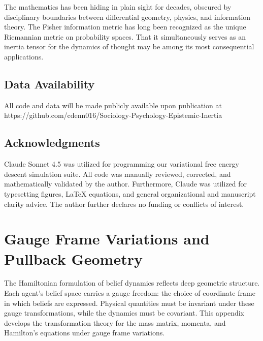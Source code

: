 \documentclass[12pt]{article}
\begin{document}
The mathematics has been hiding in plain sight for decades, obscured by disciplinary boundaries between differential geometry, physics, and information theory. The Fisher information metric has long been recognized as the unique Riemannian metric on probability spaces. That it simultaneously serves as an inertia tensor for the dynamics of thought may be among its most consequential applications.

\subsection*{Data Availability}
All code and data will be made publicly available upon publication at \\ 
https://github.com/cdenn016/Sociology-Psychology-Epistemic-Inertia


\subsection*{Acknowledgments}
Claude Sonnet 4.5 was utilized for programming our variational free energy descent simulation suite.  All code was manually reviewed, corrected, and mathematically validated by the author.  Furthermore, Claude was utilized for typesetting figures, LaTeX equations, and general organizational and manuscript clarity advice. The author further declares no funding or conflicts of interest.

\appendix


\section{Gauge Frame Variations and Pullback Geometry}
\label{app:gauge}

The Hamiltonian formulation of belief dynamics reflects deep geometric structure. Each agent's belief space carries a gauge freedom: the choice of coordinate frame in which beliefs are expressed. Physical quantities must be invariant under these gauge transformations, while the dynamics must be covariant. This appendix develops the transformation theory for the mass matrix, momenta, and Hamilton's equations under gauge frame variations.

\end{document}
